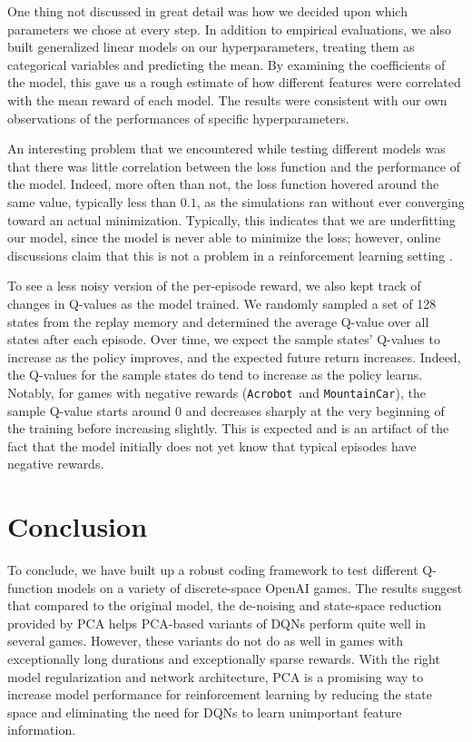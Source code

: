 \documentclass[11pt]{article}
\newcommand{\ab}{\texttt{Acrobot}}
\newcommand{\mc}{\texttt{MountainCar}}
\begin{document}
One thing not discussed in great detail was how we decided upon which parameters we chose at every step. In addition to empirical evaluations, we also built generalized linear models on our hyperparameters, treating them as categorical variables and predicting the mean. By examining the coefficients of the model, this gave us a rough estimate of how different features were correlated with the mean reward of each model. The results were consistent with our own observations of the performances of specific hyperparameters.

An interesting problem that we encountered while testing different models was that there was little correlation between the loss function and the performance of the model. Indeed, more often than not, the loss function hovered around the same value, typically less than $0.1$, as the simulations ran without ever converging toward an actual minimization. Typically, this indicates that we are underfitting our model, since the model is never able to minimize the loss; however, online discussions claim that this is not a problem in a reinforcement learning setting \cite{stackexchange2017loss}.

To see a less noisy version of the per-episode reward, we also kept track of changes in Q-values as the model trained. We randomly sampled a set of 128 states from the replay memory and determined the average Q-value over all states after each episode. Over time, we expect the sample states' Q-values to increase as the policy improves, and the expected future return increases. Indeed, the Q-values for the sample states do tend to increase as the policy learns. Notably, for games with negative rewards (\ab~and \mc), the sample Q-value starts around 0 and decreases sharply at the very beginning of the training before increasing slightly. This is expected and is an artifact of the fact that the model initially does not yet know that typical episodes have negative rewards. 

\section{Conclusion}

To conclude, we have built up a robust coding framework to test different Q-function models on a variety of discrete-space OpenAI games. The results suggest that compared to the original model, the de-noising and state-space reduction provided by PCA helps PCA-based variants of DQNs perform quite well in several games. However, these variants do not do as well in games with exceptionally long durations and exceptionally sparse rewards. With the right model regularization and network architecture, PCA is a promising way to increase model performance for reinforcement learning by reducing the state space and eliminating the need for DQNs to learn unimportant feature information.
\end{document}

